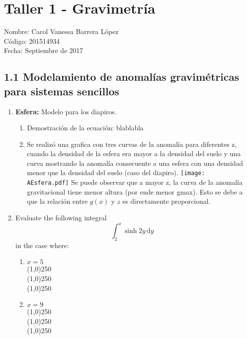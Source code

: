 \documentclass{article}
\begin{document}
\section*{Taller 1 - Gravimetr\'ia}
Nombre: Carol Vanessa Barrera L\'opez 
\\ C\'odigo: 201514934
\\Fecha: Septiembre de 2017

\subsection*{1.1 Modelamiento de anomal\'ias gravim\'etricas para sistemas sencillos} 

\begin{enumerate}%

\item {\bf Esfera:} Modelo para los diapiros.
	\begin{enumerate}
	\item Demostraci\'on de la ecuaci\'on:
	blablabla
	\item Se realiz\'o una grafica con tres curvas de la anomal\'ia para diferentes z, cuando la densidad de la esfera era mayor a la densidad del suelo y una curva mostrando la anomal\'ia consecuente a una esfera con una densidad menor que la densidad del suelo (caso del diapiro).
	\texttt{[image: AEsfera.pdf]}\centering
	Se puede observar que a mayor z, la curva de la anomal\'ia gravitacional tiene menor altura (por ende menor gmax). Esto se debe a que la relaci\'on entre $g(x)$ y $z$ es directamente proporcional.
	\end{enumerate}

\item Evaluate the following integral 
\begin{equation*}
\int_{2}^{x} \sinh{2y}\, \mathrm{d}y
\end{equation*}
in the case where:
    \begin{enumerate}
    \item $x = 5$
    \\\line(1,0){250}
    \\\line(1,0){250}
    \\\line(1,0){250}
    \item $x = 9$
    \\\line(1,0){250}
    \\\line(1,0){250}
    \\\line(1,0){250}
    \end{enumerate}
    

\end{enumerate}
\end{document}
